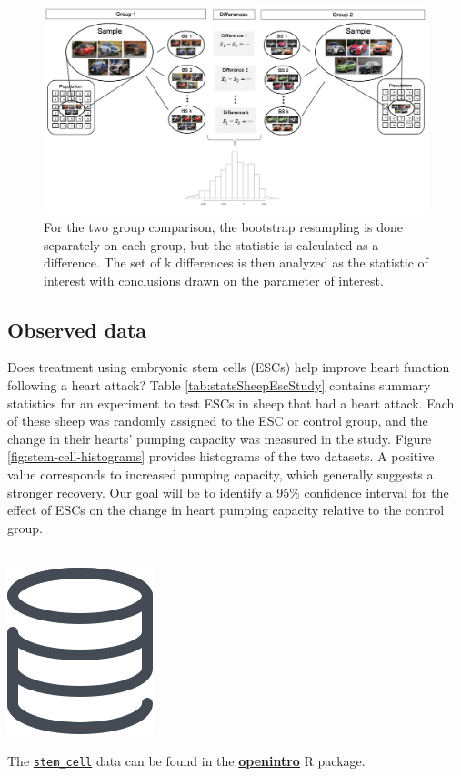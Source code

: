 \documentclass[
  10pt,
  openany]{book}
\newenvironment{mdframedwithfootTipDataPro}
{   
    \savenotes
    \begin{mdframed}[%
    topline=true, bottomline=true, linecolor=oiGray, linewidth=0.5pt,
    rightline=false, leftline=false,
    backgroundcolor=oiLGray]
    \renewcommand{\thempfootnote}{\arabic{footnote}}
    }
{
    \end{mdframed}
    \spewnotes
}
\newenvironment{data}{
\vspace{4mm}
\begin{mdframedwithfootTipDataPro}
\begin{minipage}[t]{0.10\textwidth}
{$\:$ \\ \setkeys{Gin}{width=2em,keepaspectratio}\includegraphics{images/_icons/data.png}}
\end{minipage}
\hfill
\begin{minipage}[t]{0.90\textwidth}
\vspace{-2mm}
\setlength{\parskip}{1em}
}{\end{minipage}
\end{mdframedwithfootTipDataPro}
\vspace{4mm}
}
\begin{document}
\begin{figure}[h]

{\centering \includegraphics[width=0.75\linewidth]{images/bootmeans2means} 

}

\caption{For the two group comparison, the bootstrap resampling is done separately on each group, but the statistic is calculated as a difference.  The set of k differences is then analyzed as the statistic of interest with conclusions drawn on the parameter of interest.}\label{fig:bootmeans2means}
\end{figure}

\hypertarget{observed-data-12}{%
\subsection{Observed data}\label{observed-data-12}}

Does treatment using embryonic stem cells (ESCs) help improve heart function following a heart attack?
Table \ref{tab:statsSheepEscStudy} contains summary statistics for an experiment to test ESCs in sheep that had a heart attack.
Each of these sheep was randomly assigned to the ESC or control group, and the change in their hearts' pumping capacity was measured in the study.
\citep{Menard:2005} Figure \ref{fig:stem-cell-histograms} provides histograms of the two datasets.
A positive value corresponds to increased pumping capacity, which generally suggests a stronger recovery.
Our goal will be to identify a 95\% confidence interval for the effect of ESCs on the change in heart pumping capacity relative to the control group.

\begin{data}
The \href{http://openintrostat.github.io/openintro/reference/stem_cell.html}{\texttt{stem\_cell}} data can be found in the \href{http://openintrostat.github.io/openintro}{\textbf{openintro}} R package.

\end{data}
\end{document}
